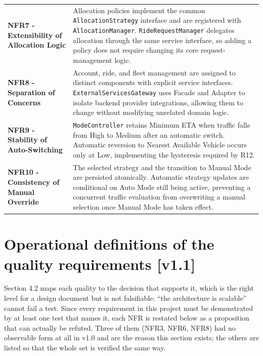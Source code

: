 \documentclass[11pt,a4paper,oneside]{report}
\newcommand{\code}[1]{\texttt{#1}}
\begin{document}
\begin{longtable}{@{}
    >{\raggedright\arraybackslash}p{}
    >{\raggedright\arraybackslash}p{}
@{}}
\textbf{NFR7 - Extensibility of Allocation Logic}
&
Allocation policies implement the common \code{AllocationStrategy}
interface and are registered with \code{AllocationManager}.
\code{RideRequestManager} delegates allocation through the same service
interface, so adding a policy does not require changing its core
request-management logic.
\\

\textbf{NFR8 - Separation of Concerns}
&
Account, ride, and fleet management are assigned to distinct components
with explicit service interfaces. \code{ExternalServicesGateway} uses
Facade and Adapter to isolate backend provider integrations, allowing
them to change without modifying unrelated domain logic.
\\

\textbf{NFR9 - Stability of Auto-Switching}
&
\code{ModeController} retains Minimum ETA when traffic falls from High
to Medium after an automatic switch. Automatic reversion to Nearest
Available Vehicle occurs only at Low, implementing the hysteresis
required by R12.
\\

\textbf{NFR10 - Consistency of Manual Override}
&
The selected strategy and the transition to Manual Mode are persisted
atomically. Automatic strategy updates are conditional on Auto Mode
still being active, preventing a concurrent traffic evaluation from
overwriting a manual selection once Manual Mode has taken effect.
\\

\end{longtable}
\endgroup
\hypertarget{operational-definitions-of-the-quality-requirements-v1.1}{%
\section{\texorpdfstring{Operational definitions of the quality
requirements
\textbf{{[}v1.1{]}}}{Operational definitions of the quality requirements {[}v1.1{]}}}\label{operational-definitions-of-the-quality-requirements-v1.1}}

Section 4.2 maps each quality to the decision that supports it, which is
the right level for a design document but is not falsifiable: ``the
architecture is scalable'' cannot fail a test. Since every requirement
in this project must be demonstrated by at least one test that names it,
each NFR is restated below as a proposition that can actually be
refuted. Three of them (NFR3, NFR6, NFR8) had no observable form at all
in v1.0 and are the reason this section exists; the others are listed so
that the whole set is verified the same way.
\end{document}
